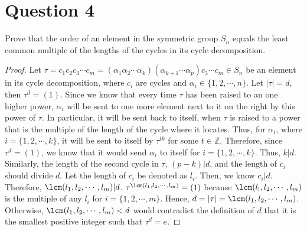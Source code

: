 \section{Question 4}

\begin{question}
   Prove that the order of an element in the symmetric group $S_n$ equals the least common multiple of the lengths of the cycles in its cycle decomposition.
\end{question}

\begin{answer}
    \begin{proof}
        Let $\tau = c_1c_2c_3\cdots c_m = (\alpha_1\alpha_2\cdots\alpha_k)(\alpha_{k+1}\cdots\alpha_p)c_3\cdots c_m \in S_n$ be an element in its cycle decomposition, where $c_i$ are cycles and $\alpha_i \in \{1,2,\cdots,n\}$. Let $\lvert \tau \rvert = d$, then $\tau^d = (1)$. Since we know that every time $\tau$ has been raised to an one higher power, $\alpha_i$ will be sent to one more element next to it on the right by this power of $\tau$. In particular, it will be sent back to itself, when $\tau$ is raised to a power that is the multiple of the length of the cycle where it locates. Thus, for $\alpha_i$, where $i = \{1,2,\cdots,k\}$, it will be sent to itself by $\tau^{tk}$ for some $t \in \mathbb{Z}$. Therefore, since $\tau^d = (1)$, we know that it would send $\alpha_i$ to itself for $i = \{1,2,\cdots,k\}$. Thus, $k \lvert d$. Similarly, the length of the second cycle in $\tau$, $(p-k)\lvert d$, and the length of $c_i$ should divide $d$. Let the length of $c_i$ be denoted as $l_i$. Then, we know $c_i \lvert d$. Therefore, $\lcm(l_1,l_2,\cdots,l_m)\lvert d$. $\tau^{\lcm(l_1,l_2,\cdots,l_m)} = (1)$ because $\lcm(l_!,l_2,\cdots,l_m)$ is the multiple of any $l_i$ for $i = \{1,2,\cdots,m\}$. Hence, $d = \lvert \tau \rvert = \lcm(l_1,l_2,\cdots,l_m)$. Otherwise, $\lcm(l_1,l_2,\cdots,l_m) < d$ would contradict the definition of $d$ that it is the smallest positive integer such that $\tau^d = e$.
    \end{proof}
\end{answer}